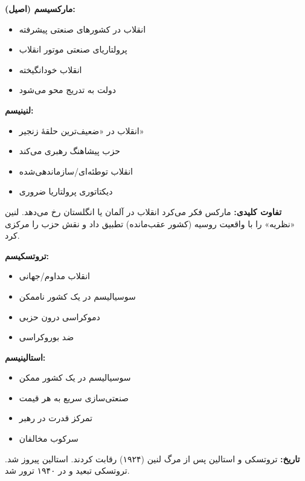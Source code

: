 \begin{tcolorbox}[
    enhanced,
    colback=leftred!5,
    colframe=leftred,
    boxrule=1.5pt,
    arc=5pt,
    fonttitle=\bfseries,
    title={\rl{🔴 مارکسیسم در برابر لنینیسم}}
]

\textbf{مارکسیسم (اصیل):}
\begin{itemize}
    \item انقلاب در کشورهای صنعتی پیشرفته
    \item پرولتاریای صنعتی موتور انقلاب
    \item انقلاب خودانگیخته
    \item دولت به تدریج محو می‌شود
\end{itemize}



\textbf{لنینیسم:}
\begin{itemize}
    \item انقلاب در «ضعیف‌ترین حلقهٔ زنجیر»
    \item حزب پیشاهنگ رهبری می‌کند
    \item انقلاب توطئه‌ای/سازماندهی‌شده
    \item دیکتاتوری پرولتاریا ضروری
\end{itemize}


\textbf{تفاوت کلیدی:} مارکس فکر می‌کرد انقلاب در آلمان یا انگلستان رخ می‌دهد. لنین «نظریه» را با واقعیت روسیه (کشور عقب‌مانده) تطبیق داد و نقش حزب را مرکزی کرد.
\end{tcolorbox}

\begin{tcolorbox}[
    enhanced,
    colback=leftred!5,
    colframe=leftred,
    boxrule=1.5pt,
    arc=5pt,
    fonttitle=\bfseries,
    title={\rl{🔴 تروتسکیسم در برابر استالینیسم}}
]

\textbf{تروتسکیسم:}
\begin{itemize}
    \item انقلاب مداوم/جهانی
    \item سوسیالیسم در یک کشور ناممکن
    \item دموکراسی درون حزبی
    \item ضد بوروکراسی
\end{itemize}



\textbf{استالینیسم:}
\begin{itemize}
    \item سوسیالیسم در یک کشور ممکن
    \item صنعتی‌سازی سریع به هر قیمت
    \item تمرکز قدرت در رهبر
    \item سرکوب مخالفان
\end{itemize}


\textbf{تاریخ:} تروتسکی و استالین پس از مرگ لنین (۱۹۲۴) رقابت کردند. استالین پیروز شد. تروتسکی تبعید و در ۱۹۴۰ ترور شد.
\end{tcolorbox}

